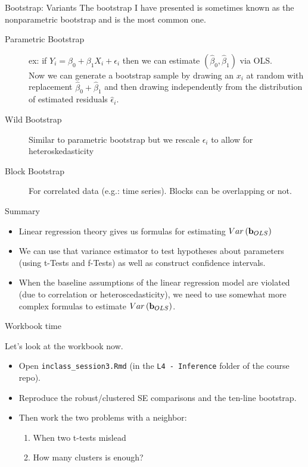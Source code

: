 \documentclass[aspectratio=169,11pt]{beamer}
\begin{document}
\begin{frame}{Bootstrap: Variants}
The bootstrap I have presented is sometimes known as the \alert{nonparametric bootstrap} and is the most common one.
\begin{description}
\item[Parametric Bootstrap] ex: if $Y_i = \beta_0 + \beta_1 X_i + \epsilon_i$ then we can estimate $(\hat{\beta}_0,\hat{\beta}_1)$ via OLS.\\
 Now we can generate a bootstrap sample by drawing an $x_i$ at random with replacement $\hat{\beta}_0 + \hat{\beta}_1$ and then drawing \alert{independently} from the distribution of estimated residuals $\hat{\epsilon}_i$.
 \item[Wild Bootstrap] Similar to parametric bootstrap but we rescale $\epsilon_i$ to allow for \alert{heteroskedasticity}
\item[Block Bootstrap] For correlated data (e.g.: time series). Blocks can be overlapping or not.  
\end{description}
\end{frame}


\begin{frame}{Summary}
\begin{itemize}
	\item Linear regression theory gives us formulas for estimating $Var\left({\bf b}_{OLS}\right)$

	\item We can use that variance estimator to test hypotheses about parameters (using t-Tests
	and f-Tests) as well as construct confidence intervals. 

	\item When the baseline assumptions of the linear regression model are violated (due to
	correlation or heteroscedasticity), we need to use somewhat more complex formulas
	to estimate  $Var\left({\bf b}_{OLS}\right)$.

\end{itemize}
\end{frame}


\begin{frame}{Workbook time}
\begin{center}
{\LARGE \alert{Let's look at the workbook now.}}
\end{center}
\bigskip
\begin{itemize}
	\item Open \texttt{inclass\_session3.Rmd} (in the \texttt{L4 - Inference} folder of the course repo).
	\item Reproduce the robust/clustered SE comparisons and the ten-line bootstrap.
	\item Then work the two problems with a neighbor:
	\begin{enumerate}
		\item When two t-tests mislead
		\item How many clusters is enough?
	\end{enumerate}
\end{itemize}
\end{frame}
\end{document}
